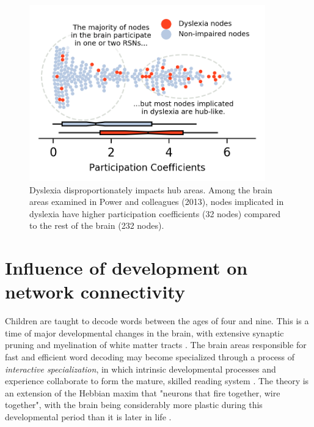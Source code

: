 \begin{figure}[h!]
\centering
\includegraphics[height=3in]{images/ch1-dyslexia-hubs.png}
    \caption[Dyslexia disproportionately impacts hub areas.]{Dyslexia disproportionately impacts hub areas. Among the brain areas examined in Power and colleagues (2013), nodes implicated in dyslexia have higher participation coefficients (32 nodes) compared to the rest of the brain (232 nodes).}
\label{fig:ch1-dyslexia-hubs}
\end{figure}

\section{Influence of development on network connectivity}

Children are taught to decode words between the ages of four and nine. This is a time of major developmental changes in the brain, with extensive synaptic pruning and myelination of white matter tracts \citep{Wandell2013}. The brain areas responsible for fast and efficient word decoding may become specialized through a process of \textit{interactive specialization}, in which intrinsic developmental processes and experience collaborate to form the mature, skilled reading system \citep{Johnson2011, Klingberg2014}. The theory is an extension of the Hebbian maxim that "neurons that fire together, wire together", with the brain being considerably more plastic during this developmental period than it is later in life \citep{Hebb1949}.

